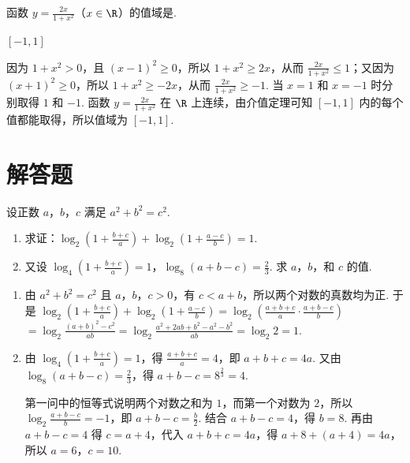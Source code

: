 \documentclass[UTF8,a4paper,oneside,11pt]{ctexbook}
\begin{document}
\begin{problem}
函数 \(y=\frac{2x}{1+x^{2}}\)（\(x\in\R\)）的值域是\fillinblank{}.
\end{problem}

\begin{answer}\([-1,1]\)\end{answer}

\begin{solution}
因为 \(1+x^{2}>0\)，且 \((x-1)^{2}\geqslant0\)，所以 \(1+x^{2}\geqslant2x\)，从而 \(\frac{2x}{1+x^{2}}\leqslant1\)；又因为 \((x+1)^{2}\geqslant0\)，所以 \(1+x^{2}\geqslant-2x\)，从而 \(\frac{2x}{1+x^{2}}\geqslant-1\). 当 \(x=1\) 和 \(x=-1\) 时分别取得 \(1\) 和 \(-1\). 函数 \(y=\frac{2x}{1+x^{2}}\) 在 \(\R\) 上连续，由介值定理可知 \([-1,1]\) 内的每个值都能取得，所以值域为 \([-1,1]\).
\end{solution}

\section{解答题}

\begin{problem}
设正数 \(a\)，\(b\)，\(c\) 满足 \(a^{2}+b^{2}=c^{2}\).
\begin{enumerate}
\item 求证：\(\log_{2}\left(1+\frac{b+c}{a}\right)+\log_{2}\left(1+\frac{a-c}{b}\right)=1\).
\item 又设 \(\log_{4}\left(1+\frac{b+c}{a}\right)=1\)，\(\log_{8}(a+b-c)=\frac23\). 求 \(a\)，\(b\)，和 \(c\) 的值.
\end{enumerate}
\end{problem}

\begin{solution}
\begin{enumerate}
\item
由 \(a^{2}+b^{2}=c^{2}\) 且 \(a\)，\(b\)，\(c>0\)，有 \(c<a+b\)，所以两个对数的真数均为正. 于是
\(\log_{2}\left(1+\frac{b+c}{a}\right)+\log_{2}\left(1+\frac{a-c}{b}\right)=\log_{2}\left(\frac{a+b+c}{a}\cdot\frac{a+b-c}{b}\right)\)
\(=\log_{2}\frac{(a+b)^{2}-c^{2}}{ab}=\log_{2}\frac{a^{2}+2ab+b^{2}-a^{2}-b^{2}}{ab}=\log_{2}2=1\).

\item
由 \(\log_{4}\left(1+\frac{b+c}{a}\right)=1\)，得 \(\frac{a+b+c}{a}=4\)，即 \(a+b+c=4a\). 又由 \(\log_{8}(a+b-c)=\frac23\)，得 \(a+b-c=8^{\frac{2}{3}}=4\).

第一问中的恒等式说明两个对数之和为 \(1\)，而第一个对数为 \(2\)，所以 \(\log_{2}\frac{a+b-c}{b}=-1\)，即 \(a+b-c=\frac b2\). 结合 \(a+b-c=4\)，得 \(b=8\). 再由 \(a+b-c=4\) 得 \(c=a+4\)，代入 \(a+b+c=4a\)，得 \(a+8+(a+4)=4a\)，所以 \(a=6\)，\(c=10\).
\end{enumerate}
\end{solution}
\end{document}
